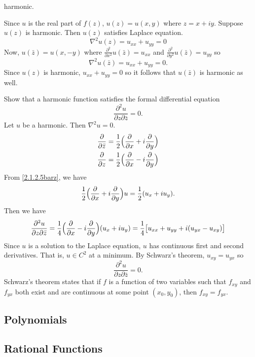 \begin{exercise}
  harmonic.
  \par\smallskip
  Since \(u\) is the real part of \(f(z)\), \(u(z) = u(x,y)\) where
  \(z = x + iy\).
  Suppose \(u(z)\) is harmonic.
  Then \(u(z)\) satisfies Laplace equation.
  \[
  \nabla^2u(z) = u_{xx} + u_{yy} = 0
  \]
  Now, \(u(\bar{z}) = u(x,-y)\) where
  \(\frac{\partial^2}{\partial x^2}u(\bar{z}) = u_{xx}\) and
  \(\frac{\partial^2}{\partial y^2}u(\bar{z}) = u_{yy}\) so
  \[
  \nabla^2u(\bar{z}) = u_{xx} + u_{yy} = 0.
  \]
  Since \(u(z)\) is harmonic, \(u_{xx} + u_{yy} = 0\) so it follows that
  \(u(\bar{z})\) is harmonic as well.
\item
  Show that a harmonic function satisfies the formal differential equation
  \[
  \frac{\partial^2u}{\partial z\partial\bar{z}} = 0.
  \]
  Let \(u\) be a harmonic.
  Then \(\nabla^2u = 0\).
  \begin{subequations}
    \begin{align}
      \frac{\partial}{\partial\bar{z}}
      & = \frac{1}{2}\Bigl(\frac{\partial}{\partial x} +
        i\frac{\partial}{\partial y}\Bigr)\label{2.1.2.5barz}\\
      \frac{\partial}{\partial z}
      & = \frac{1}{2}\Bigl(\frac{\partial}{\partial x} -
        i\frac{\partial}{\partial y}\Bigr)\label{2.1.2.5z}
    \end{align}
  \end{subequations}
  From \cref{2.1.2.5barz}, we have
  \[
  \frac{1}{2}\Bigl(\frac{\partial}{\partial x} +
  i\frac{\partial}{\partial y}\Bigr)u = \frac{1}{2}(u_x + iu_y).
  \]
  Then we have
  \[
  \frac{\partial^2u}{\partial z\partial\bar{z}} =
  \frac{1}{4}\Bigl(\frac{\partial}{\partial x} -
  i\frac{\partial}{\partial y}\Bigr)(u_x + iu_y) =
  \frac{1}{4}\bigl[u_{xx} + u_{yy} + i(u_{yx} - u_{xy})\bigr]
  \]
  Since \(u\) is a solution to the Laplace equation, \(u\) has continuous first
  and second derivatives.
  That is, \(u\in C^2\) at a minimum.
  By Schwarz's theorem, \(u_{xy} = u_{yx}\) so
  \[
  \frac{\partial^2u}{\partial z\partial\bar{z}} = 0.
  \]
  Schwarz's theorem states that if \(f\) is a function of two variables such
  that \(f_{xy}\) and \(f_{yx}\) both exist and are continuous at some point
  \((x_0,y_0)\), then \(f_{xy} = f_{yx}\).
\end{exercise}

\subsection{Polynomials}

\subsection{Rational Functions}

